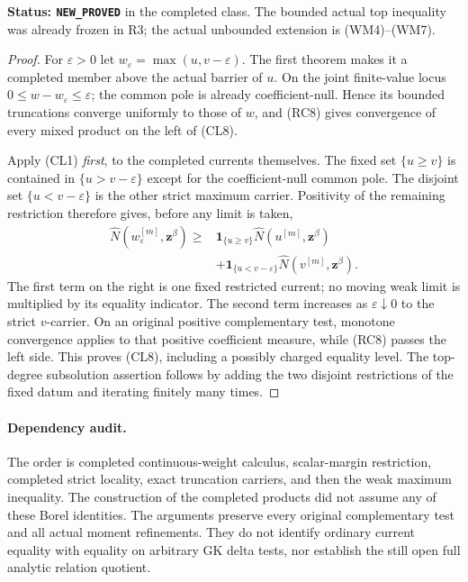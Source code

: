\documentclass[11pt,a4paper]{article}
\numberwithin{equation}{section}
\theoremstyle{definition}
\theoremstyle{remark}
\begin{document}
\noindent\textbf{Status: \texttt{NEW\_PROVED}} in the completed
class. The bounded actual top inequality was already frozen
in R3; the actual unbounded extension is (WM4)--(WM7).

\begin{proof}
For $\varepsilon>0$ let
$w_\varepsilon=\max(u,v-\varepsilon)$.
The first theorem makes it a completed member above the actual
barrier of $u$. On the joint finite-value locus
$0\leq w-w_\varepsilon\leq\varepsilon$; the common pole is
already coefficient-null. Hence its bounded truncations converge
uniformly to those of $w$, and (RC8) gives convergence of every
mixed product on the left of (CL8).

Apply (CL1) \emph{first}, to the completed currents themselves.
The fixed set $\{u\geq v\}$ is contained in
$\{u>v-\varepsilon\}$ except for the coefficient-null common
pole. The disjoint set $\{u<v-\varepsilon\}$ is the other
strict maximum carrier. Positivity of the remaining restriction
therefore gives, before any limit is taken,
\[
 \begin{split}
 \widehat N(w_\varepsilon^{[m]},\mathbf z^\beta)
 \geq{}&\mathbf1_{\{u\geq v\}}
                   \widehat N(u^{[m]},\mathbf z^\beta)\\
       &+\mathbf1_{\{u<v-\varepsilon\}}
                   \widehat N(v^{[m]},\mathbf z^\beta).
 \end{split}
 \tag{CL9}
\]
The first term on the right is one fixed restricted current;
no moving weak limit is multiplied by its equality indicator.
The second term increases as $\varepsilon\downarrow0$ to the
strict $v$-carrier. On an original positive complementary test,
monotone convergence applies to that positive coefficient
measure, while (RC8) passes the left side. This proves (CL8),
including a possibly charged equality level. The top-degree
subsolution assertion follows by adding the two disjoint
restrictions of the fixed datum and iterating finitely many times.
\end{proof}

\paragraph{Dependency audit.}
The order is completed continuous-weight calculus, scalar-margin
restriction, completed strict locality, exact truncation carriers,
and then the weak maximum inequality. The construction of the
completed products did not assume any of these Borel identities.
The arguments preserve every original complementary test and
all actual moment refinements. They do not identify ordinary
current equality with equality on arbitrary GK delta tests,
nor establish the still open full analytic relation quotient.
\end{document}
